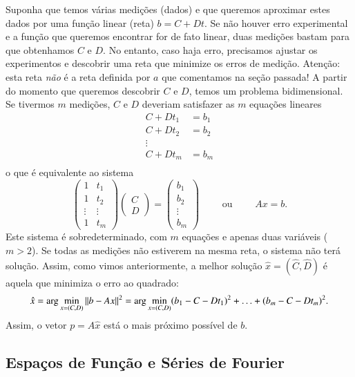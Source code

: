 Suponha que temos várias medições (dados) e que queremos aproximar estes dados por uma função linear (reta) $b=C+Dt$. Se não houver erro experimental e a função que queremos encontrar for de fato linear, duas medições bastam para que obtenhamos $C$ e $D$. No entanto, caso haja erro, precisamos ajustar os experimentos e descobrir uma reta que minimize os erros de medição. Atenção: esta reta \emph{não} é a reta definida por $a$ que comentamos na seção passada! A partir do momento que queremos descobrir $C$ e $D$, temos um problema bidimensional. Se tivermos $m$ medições, $C$ e $D$ deveriam satisfazer as $m$ equações lineares
\begin{align*}
   C+Dt_1&=b_1\\
   C+Dt_2&=b_2\\
   \vdots&\\
   C+Dt_m&=b_m\\
\end{align*}
o que é equivalente ao sistema
\begin{equation*}
	\begin{pmatrix}
       1 & t_1\\
       1 & t_2\\
       \vdots & \vdots\\
       1 & t_m
    \end{pmatrix}
    \begin{pmatrix}
       C\\
       D
    \end{pmatrix}
	=
    \begin{pmatrix}
       b_1\\
       b_2\\
       \vdots\\
       b_m
    \end{pmatrix}
	\qquad \mbox{ ou } \qquad Ax=b.
\end{equation*}
Este sistema é sobredeterminado, com $m$ equações e apenas duas variáveis ($m>2$). Se todas as medições não estiverem na mesma reta, o sistema não terá solução. Assim, como vimos anteriormente, a melhor solução $\hat{x}=(\hat{C},\hat{D})$ é aquela que minimiza o erro ao quadrado:
\begin{equation*}
   \hat{x} = \arg \min_{x=(C,D)} \| b-Ax \|^2 = \arg \min_{x=(C,D)} (b_1-C-Dt_1)^2 + \ldots + (b_m-C-Dt_m)^2.
\end{equation*}
Assim, o vetor $p=A\hat{x}$ está o mais próximo possível de $b$.

\subsection{Espaços de Função e Séries de Fourier}

